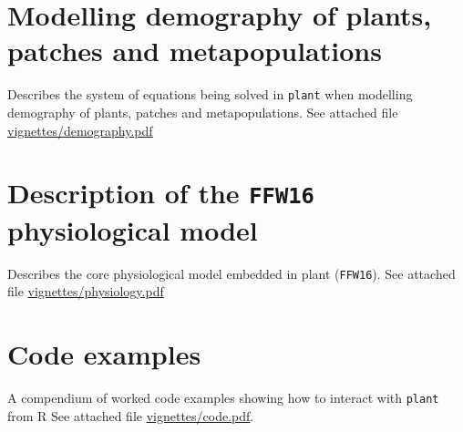 \documentclass[a4paper,11pt]{article}
\newcommand{\plant}{\texttt{plant}}
\begin{document}
\begin{appendices}\label{sec:appendices}

\section{Modelling demography of plants, patches and metapopulations}\label{sec:demography}

Describes the system of equations being solved in {\plant} when modelling demography of plants, patches and metapopulations. See attached file \url{vignettes/demography.pdf}

\section{Description of the \texttt{FFW16} physiological model}\label{sec:FFW16}

Describes the core physiological model embedded in plant (\texttt{FFW16}). See attached file \url{vignettes/physiology.pdf}

\section{Code examples}\label{sec:code}

A compendium of worked code examples showing how to interact with {\plant} from R
See attached file \url{vignettes/code.pdf}.

\end{appendices}
\end{document}
